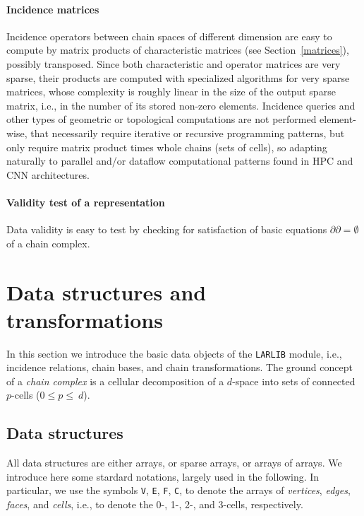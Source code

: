 \paragraph{Incidence matrices}
Incidence operators between chain spaces of different dimension are easy to compute by matrix products of characteristic matrices (see Section~\ref{matrices}), possibly transposed.
Since both characteristic and operator matrices are very sparse, their products are computed with  specialized algorithms for very sparse matrices, whose complexity is roughly linear in the size of the output sparse matrix, i.e., in the number of its stored non-zero elements.
Incidence queries and other types of geometric or topological computations are not performed element-wise, that necessarily require iterative or recursive programming patterns, but only require matrix product times whole chains (sets of cells), so adapting naturally to parallel and/or dataflow computational patterns found in HPC and CNN architectures.

\paragraph{Validity test of a representation}
Data validity is easy to test by checking for satisfaction of basic equations $\partial\partial=\emptyset$ of a chain complex.



\section{Data structures and transformations}
\label{sec:datastructures}

In this section we introduce the basic data objects of the \texttt{LARLIB} module,
i.e., incidence relations, chain bases, and chain transformations. The ground concept of a \emph{chain complex} is a cellular decomposition of a $d$-space into sets of connected $p$-cells ($0\leq p\leq\ d$). 

\subsection{Data structures}
\label{sec:data} All data structures are either arrays, or sparse arrays, or arrays of arrays. We introduce here some stardard notations, largely used in the following. In particular, we use the symbols \texttt{V}, \texttt{E}, \texttt{F}, \texttt{C}, to denote the arrays of \emph{vertices}, \emph{edges}, \emph{faces}, and \emph{cells},  i.e., to denote the 0-, 1-, 2-, and 3-cells, respectively. 

